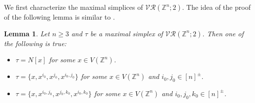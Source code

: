 \documentclass{amsart}
\newtheorem{lemma}[theorem]{Lemma}
\theoremstyle{definition}
\theoremstyle{remark}
\numberwithin{equation}{section}
\newcommand{\vr}[2]{\mathcal{VR}(#1;#2)}
\def\Z{{\mathbb{Z}}}
\begin{document}
We first characterize the maximal simplices of $\vr{\Z^n}{2}$.  The idea of the proof of the following lemma is similar to \cite[Lemma 3.1]{Shukla2023}. 

\begin{lemma} \label{thm:maximal2}
	Let  $n \geq 3$  and $\tau $ be a maximal simplex of $\vr{\Z^n}{2}$. Then one of the following is true:
	\begin{itemize}
		\item[(i)] $\tau = N[x]$ for some $x \in V(\Z^n)$.
		\item[(ii)] $\tau = \{x, x^{i_0}, x^{j_0}, x^{i_0, j_0}\}$ for some $x \in V(\Z^n)$ and $i_0, j_0 \in [n]^{\pm}$.
		\item[(iii)] $\tau = \{x,x^{i_0,j_0},x^{j_0,k_0},x^{i_0,k_0}\}$ for some $x \in V(\Z^n)$ and $i_0, j_0, k_0 \in [n]^{\pm}$.
		
	\end{itemize}
\end{lemma}
\end{document}
